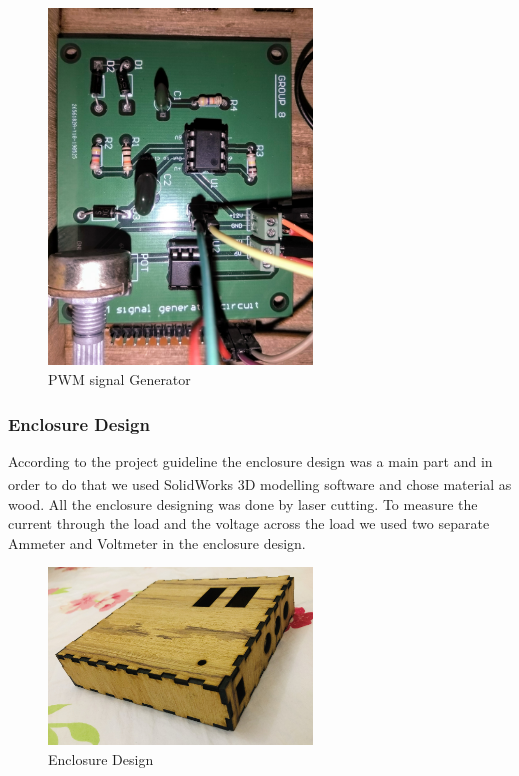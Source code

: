 \documentclass[a4paper,12pt]{article}
\begin{document}
\begin{multicols}{2}
\begin{figure}[H]
    \centering
    \includegraphics[width=7cm]{Fig_03.jpg}
    \caption{PWM signal Generator}
    \label{fig:Buck Converter}
\end{figure}
\subsubsection{Enclosure Design}
According to the project guideline the enclosure design was a main part and in order to do that we used SolidWorks\textsuperscript{\textregistered} 3D modelling software and chose material as wood. All the enclosure designing was done by laser cutting. To measure the current through the load and the voltage across the load we used two separate Ammeter and Voltmeter in the enclosure design.
\begin{figure}[H]
    \centering
    \includegraphics[width=7cm]{enclosure1.jpg}
    \caption{Enclosure Design}
    \label{fig:Enclosure}
\end{figure}

\end{multicols}
\end{document}
